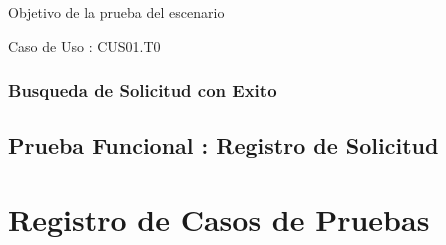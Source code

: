 Objetivo de la prueba del escenario

Caso de Uso : CUS01.T0


\subsubsection {Busqueda de Solicitud con Exito}



\subsection{Prueba Funcional : Registro de Solicitud}

\section{Registro de Casos de Pruebas}
